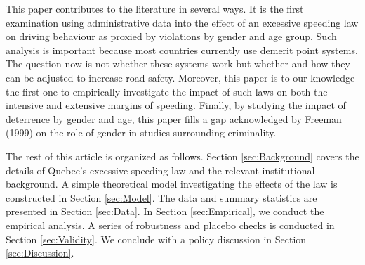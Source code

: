 This paper contributes to the literature in several ways. 
It is the first examination using administrative data into the effect of 
an excessive speeding law on driving behaviour 
as proxied by violations by gender and age group. 
Such analysis is important because most countries currently use demerit point systems. 
The question now is not whether these systems work 
but whether and how they can be adjusted to increase road safety. 
Moreover, this paper is to our knowledge the first one to empirically investigate 
the impact of such laws on both the intensive and extensive margins of speeding. 
Finally, by studying the impact of deterrence by gender and age, 
this paper fills a gap acknowledged by Freeman (1999) 
on the role of gender in studies surrounding criminality.

The rest of this article is organized as follows. 
Section \ref{sec:Background} covers the details of Quebec’s excessive speeding law 
and the relevant institutional background. 
A simple theoretical model investigating the effects of the law is constructed in Section \ref{sec:Model}. 
The data and summary statistics are presented in Section \ref{sec:Data}. 
In Section \ref{sec:Empirical}, we conduct the empirical analysis. 
A series of robustness and placebo checks is conducted in Section \ref{sec:Validity}. 
We conclude with a policy discussion in Section \ref{sec:Discussion}.

